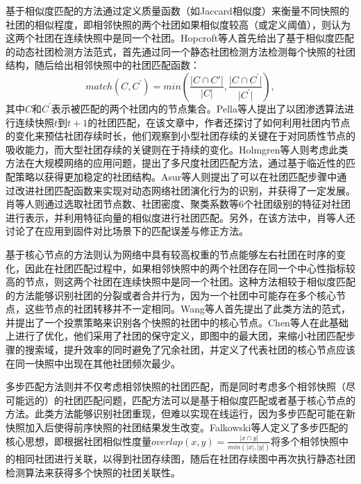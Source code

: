 基于相似度匹配的方法通过定义质量函数（如Jaccard相似度）来衡量不同快照的社团的相似程度，即相邻快照的两个社团如果相似度较高（或定义阈值），则认为这两个社团在连续快照中是同一个社团。Hopcroft等人\cite{hopcroft2004tracking}首先给出了基于相似度匹配的动态社团检测方法范式，首先通过同一个静态社团检测方法检测每个快照的社团结构，随后给出相邻快照中的社团匹配函数：
\begin{equation}
    match(C,C^{'})=min(\frac{\lvert C \cap C{'} \rvert}{\lvert C \rvert},\frac{\lvert C \cap C^{'} \rvert}{\lvert C^{'} \rvert}),
\end{equation}
其中$C$和$C^{'}$表示被匹配的两个社团内的节点集合。Pella等人\cite{palla2007quantifying}提出了以团渗透算法进行连续快照$t$到$t+1$的社团匹配，在该文章中，作者还探讨了如何利用社团内节点的变化来预估社团存续时长，他们观察到小型社团存续的关键在于对同质性节点的吸收能力，而大型社团存续的关键则在于持续的变化。Holmgren等人\cite{holmgren2023mapping}则考虑此类方法在大规模网络的应用问题，提出了多尺度社团匹配方法，通过基于临近性的匹配策略以获得更加稳定的社团结构。Asur等人\cite{asur2009event}则提出了可以在社团匹配步骤中通过改进社团匹配函数来实现对动态网络社团演化行为的识别，并获得了一定发展。肖等人\cite{JFYZ202201012}则通过选取社团节点数、社团密度、聚类系数等$6$个社团级别的特征对社团进行表示，并利用特征向量的相似度进行社团匹配。另外，在该方法中，肖等人还讨论了在应用到固件对比场景下的匹配误差与修正方法。

基于核心节点的方法则认为网络中具有较高权重的节点能够左右社团在时序的变化，因此在社团匹配过程中，如果相邻快照中的两个社团存在同一个中心性指标较高的节点，则这两个社团在连续快照中是同一个社团。这种方法相较于相似度匹配的方法能够识别社团的分裂或者合并行为，因为一个社团中可能存在多个核心节点，这些节点的社团转移并不一定相同。Wang等人\cite{wang2008commtracker}首先提出了此类方法的范式，并提出了一个投票策略来识别各个快照的社团中的核心节点。Chen等人\cite{chen2010detecting}在此基础上进行了优化，他们采用了社团的保守定义，即图中的最大团，来缩小社团匹配步骤的搜索域，提升效率的同时避免了冗余社团，并定义了代表社团的核心节点应该在同一快照中出现在其他社团频次最少。

多步匹配方法则并不仅考虑相邻快照的社团匹配，而是同时考虑多个相邻快照（尽可能远的）的社团匹配问题，匹配方法可以是基于相似度匹配或者基于核心节点的方法。此类方法能够识别社团重现，但难以实现在线运行，因为多步匹配可能在新快照加入后使得前序快照的社团结果发生改变。Falkowski等人\cite{falkowski2006mining}定义了多步匹配的核心思想，即根据社团相似性度量$overlap(x,y)=\frac{\lvert x \cap y \rvert}{min(\lvert x \rvert,\lvert y \rvert)}$将多个相邻快照中的相同社团进行关联，以得到社团存续图，随后在社团存续图中再次执行静态社团检测算法来获得多个快照的社团关联性。

